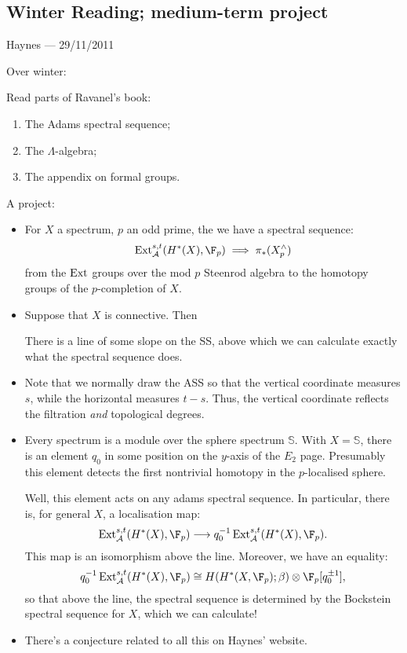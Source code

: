 \documentclass[11pt]{article}
\newcommand{\CONVERSATION}[3]{
\subsection*{#1}
\begin{flushright}
{\small #2 --- #3}
\end{flushright}
}
\begin{document}
\begin{don't show}
\pagebreak
\CONVERSATION{Winter Reading; medium-term project}{Haynes}{29/11/2011}
Over winter:
\begin{itemise}
\item Read parts of Ravanel's book:
\begin{enumerate}\squishlist
\item The Adams spectral sequence;
\item The $\Lambda$-algebra;
\item The appendix on formal groups.
\end{enumerate}
\item A project:
\begin{itemize}\squishlist
\item For $X$ a spectrum, $p$ an odd prime, the we have a spectral sequence:
\[\Ext^{s,t}_\calA(H^*(X),\F_p)\implies\pi_*(X^\wedge_p)\]
from the $\operatorname{Ext}$ groups over the mod $p$ Steenrod algebra to the homotopy groups of the $p$-completion of $X$.
\item Suppose that $X$ is connective. Then
\begin{thm*}
There is a line of some slope on the SS, above which we can calculate exactly what the spectral sequence does.
\end{thm*}
\item Note that we normally draw the ASS so that the vertical coordinate measures $s$, while the horizontal measures $t-s$. Thus, the vertical coordinate reflects the filtration \emph{and} topological degrees.
\item Every spectrum is a module over the sphere spectrum $\mathbb{S}$. With $X=\mathbb{S}$, there is an element $q_0$ in some position on the $y$-axis of the $E_2$ page. Presumably this element detects the first nontrivial homotopy in the $p$-localised sphere.

Well, this element acts on any adams spectral sequence. In particular, there is, for general $X$, a localisation map:
\[\Ext^{s,t}_\calA(H^*(X),\F_p)\to q_0^{-1}\Ext^{s,t}_\calA(H^*(X),\F_p).\]
This map is an isomorphism above the line. Moreover, we have an equality:
\[q_0^{-1}\Ext^{s,t}_\calA(H^*(X),\F_p)\cong H(H^*(X,\F_p);\beta)\otimes\F_p[q_0^{\pm1}],\]
so that above the line, the spectral sequence is determined by the Bockstein spectral sequence for $X$, which we can calculate!
\item There's a conjecture related to all this on Haynes' website.
\end{itemize}
\end{itemise}


\end{don't show}
\end{document}
